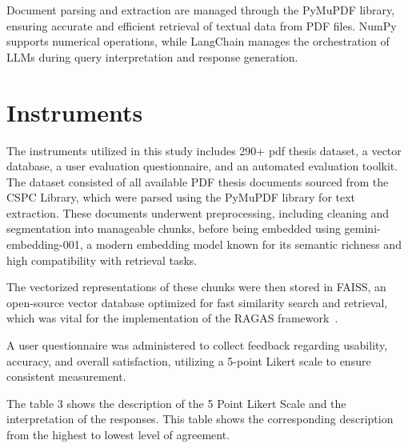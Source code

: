 \begin{refsection}
Document parsing and extraction are managed through the PyMuPDF library, ensuring accurate and efficient retrieval of textual data from PDF files. NumPy supports numerical operations, while LangChain manages the orchestration of LLMs during query interpretation and response generation.

\section{Instruments}


The instruments utilized in this study includes 290+ pdf thesis dataset, a vector database, a user evaluation questionnaire, and an automated evaluation toolkit. The dataset consisted of all available PDF thesis documents sourced from the CSPC Library, which were parsed using the PyMuPDF library for text extraction. These documents underwent preprocessing, including cleaning and segmentation into manageable chunks, before being embedded using gemini-embedding-001, a modern embedding model known for its semantic richness and high compatibility with retrieval tasks.

The vectorized representations of these chunks were then stored in FAISS, an open-source vector database optimized for fast similarity search and retrieval, which was vital for the implementation of the RAGAS framework~\cite{trychroma2023chroma}.

A user questionnaire was administered to collect feedback regarding usability, accuracy, and overall satisfaction, utilizing a 5-point Likert scale to ensure consistent measurement.

The table 3 shows the description of the 5 Point Likert Scale and the interpretation of the responses. This table shows the corresponding description from the highest to lowest level of agreement.


\end{refsection}
